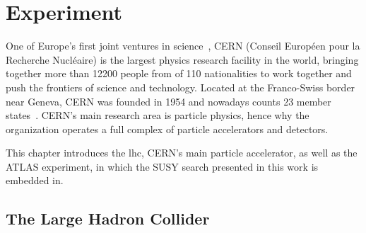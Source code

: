 
\chapter{Experiment} 

\ifpdf
    \graphicspath{{chapter-experiment/Figs/Raster/}{chapter-experiment/Figs/PDF/}{chapter-experiment/Figs/}}
\else
    \graphicspath{{chapter-experiment/Figs/Vector/}{chapter-experiment/Figs/}}
\fi


One of Europe's first joint ventures in science~\cite{About:1997225}, CERN (Conseil Européen pour la Recherche Nucléaire) is the largest physics research facility in the world, bringing together more than \num[group-separator={,}]{12200} people from of 110 nationalities to work together and push the frontiers of science and technology. Located at the Franco-Swiss border near Geneva, CERN was founded in 1954 and nowadays counts 23 member states~\cite{About:1997225}. CERN's main research area is particle physics, hence why the organization operates a full complex of particle accelerators and detectors.

This chapter introduces the \gls{lhc}, CERN's main particle accelerator, as well as the ATLAS experiment, in which the SUSY search presented in this work is embedded in.

\section{The Large Hadron Collider}\label{sec:lhc}

